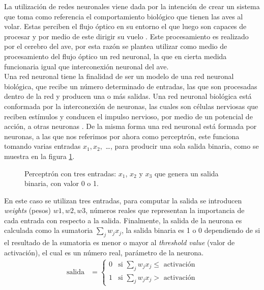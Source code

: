 \documentclass{iccmemoria}
\begin{document}
La utilización de redes neuronales viene dada por la intención de crear un sistema que toma como referencia el comportamiento biológico que tienen las aves al volar. Estas perciben el flujo óptico en su entorno el que luego son capaces de procesar y por medio de este dirigir su vuelo \cite{bhagavatula2011optic}. Este procesamiento es realizado por el cerebro del ave, por esta razón se plantea utilizar como medio de procesamiento del flujo óptico un red neuronal, la que en cierta medida funcionaria igual que interconexión neuronal del ave.\\

Una red neuronal tiene la finalidad de ser un modelo de una red neuronal biológica, que recibe un número determinado de entradas, las que son procesadas dentro de la red y producen una o más salidas. Una red neuronal biológica está conformada por la interconexión de neuronas, las cuales son células nerviosas que reciben estímulos y conducen el impulso nervioso, por medio de un potencial de acción, a otras neuronas \cite{cayre2002common}. De la misma forma una red neuronal está formada por neuronas, a las que nos referimos por ahora como perceptrón, este funciona tomando varias entradas $ x_{1}, x_{2}, $ \dots, para producir una sola salida binaria, como se muestra en la figura \ref{fig:perceptron}.\\

\begin{figure}[H]
  \centering
  \begin{Large}
  
  \end{Large}
  \caption[Representación de un perceptrón.]{Perceptrón con tres entradas: $x_{1}$, $x_{2}$ y $x_{3}$ que genera un salida binaria, con valor 0 o 1.}
  \label{fig:perceptron}
\end{figure}

En este caso se utilizan tres entradas, para computar la salida se introducen \emph{weights} (pesos) $w1, w2, w3$, números reales que representan la importancia de cada entrada con respecto a la salida. Finalmente, la salida de la neurona es calculada como la sumatoria $ \sum_{j}{} w_{j} x_{j}$, la salida binaria es 1 o 0 dependiendo de si el resultado de la sumatoria es menor o mayor al \emph{threshold value} (valor de activación), el cual es un número real, parámetro de la neurona.\\

\begin{equation}
	\begin{split}
	\mbox{salida} & = \begin{cases}
		0 & \mbox{si } \sum_j w_j x_j \leq  \mbox{ activación}\\
		1 & \mbox{si } \sum_j w_j x_j >  \mbox{ activación}
		\end{cases}
	\end{split}
\end{equation}\\
\end{document}
